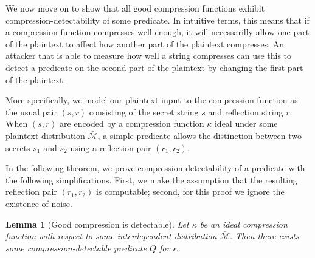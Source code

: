 \documentclass[conference, letterpaper, 10pt]{IEEEtran}
\newtheorem{lemma}{Lemma}
\begin{document}
We now move on to show that all good compression functions exhibit
compression-detectability of some predicate. In intuitive terms, this means
that if a compression function compresses well enough, it will necessarilly
allow one part of the plaintext to affect how another part of the plaintext
compresses. An attacker that is able to measure how well a string compresses
can use this to detect a predicate on the second part of the plaintext by
changing the first part of the plaintext.

More specifically, we model our plaintext input to the compression function as
the usual pair $(s, r)$ consisting of the secret string $s$ and reflection
string $r$. When $(s, r)$ are encoded by a compression function $\kappa$ ideal
under some plaintext distribution $\bar{\mathcal{M}}$, a simple predicate
allows the distinction between two secrets $s_1$ and $s_2$ using a reflection
pair $(r_1, r_2)$.

In the following theorem, we prove compression detectability of a predicate
with the following simplifications. First, we make the assumption that the
resulting reflection pair $(r_1, r_2)$ is computable; second, for this proof
we ignore the existence of noise.

\begin{lemma}[Good compression is detectable]
Let $\kappa$ be an ideal compression function with respect to some
interdependent distribution $\bar{\mathcal{M}}$. Then there exists
some compression-detectable predicate $Q$ for $\kappa$.
\end{lemma}
\end{document}
